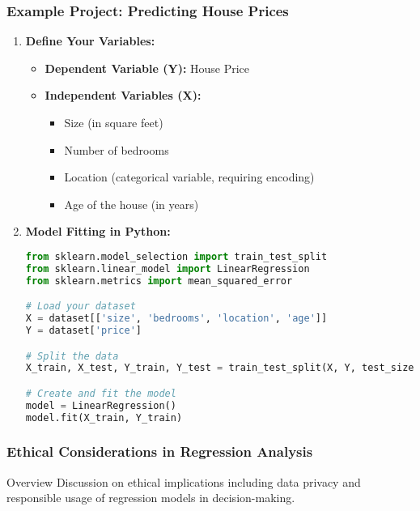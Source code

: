 \documentclass{beamer}
\begin{document}
\begin{frame}[fragile]
    \frametitle{Example Project: Predicting House Prices}
    \begin{enumerate}
        \item \textbf{Define Your Variables:}
        \begin{itemize}
            \item \textbf{Dependent Variable (Y):} House Price
            \item \textbf{Independent Variables (X):}
            \begin{itemize}
                \item Size (in square feet)
                \item Number of bedrooms
                \item Location (categorical variable, requiring encoding)
                \item Age of the house (in years)
            \end{itemize}
        \end{itemize}
        
        \item \textbf{Model Fitting in Python:}
        \begin{lstlisting}[language=Python]
from sklearn.model_selection import train_test_split
from sklearn.linear_model import LinearRegression
from sklearn.metrics import mean_squared_error

# Load your dataset
X = dataset[['size', 'bedrooms', 'location', 'age']]
Y = dataset['price']

# Split the data
X_train, X_test, Y_train, Y_test = train_test_split(X, Y, test_size=0.2, random_state=42)

# Create and fit the model
model = LinearRegression()
model.fit(X_train, Y_train)
        \end{lstlisting}
        
    \end{enumerate}
\end{frame}

\begin{frame}[fragile]
    \frametitle{Ethical Considerations in Regression Analysis}
    \begin{block}{Overview}
        Discussion on ethical implications including data privacy and responsible usage of regression models in decision-making.
    \end{block}
\end{frame}
\end{document}
